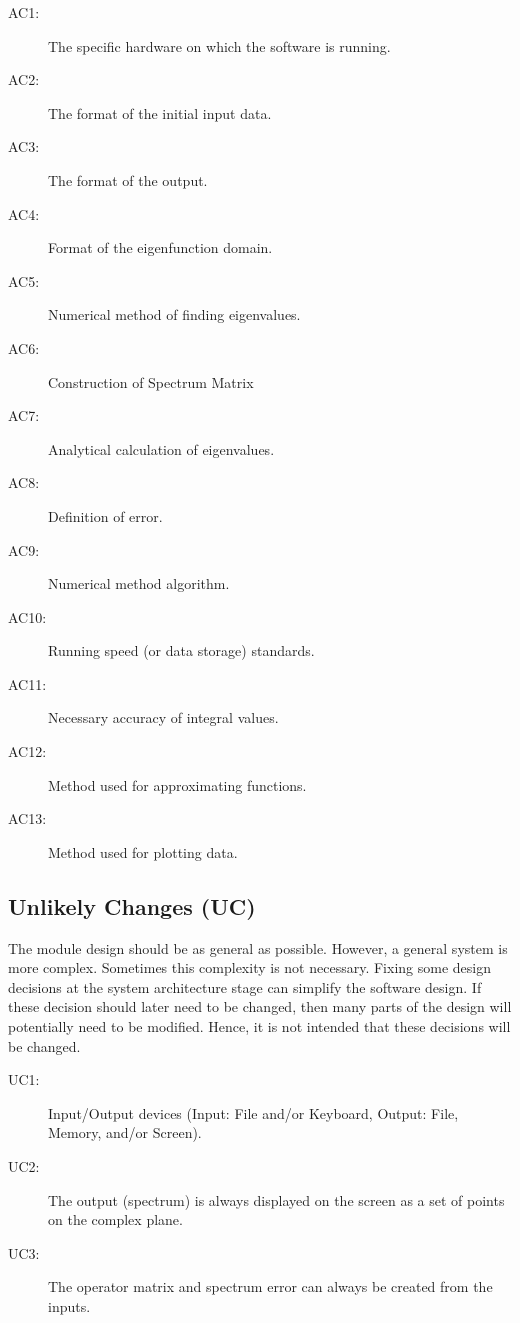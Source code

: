 \documentclass[12pt, titlepage]{article}
\begin{document}
\begin{description}
\item[AC1:] The specific hardware on which the software is running.\\
\item[AC2:] The format of the initial input data.\\
\item[AC3:] The format of the output.\\
\item[AC4:] Format of the eigenfunction domain. \\
\item[AC5:] Numerical method of finding eigenvalues. \\ 
\item[AC6:] Construction of Spectrum Matrix \\ 
\item[AC7:] Analytical calculation of eigenvalues. \\
\item[AC8:] Definition of error. \\
\item[AC9:] Numerical method algorithm. \\ 
\item[AC10:] Running speed (or data storage) standards. \\ 
\item[AC11:] Necessary accuracy of integral values. \\ 
\item[AC12:] Method used for approximating functions. \\
\item[AC13:] Method used for plotting data. \\
\end{description}

\subsection{Unlikely Changes (UC)} \label{SecUchange}

The module design should be as general as possible. However, a general system is
more complex. Sometimes this complexity is not necessary. Fixing some design
decisions at the system architecture stage can simplify the software design. If
these decision should later need to be changed, then many parts of the design
will potentially need to be modified. Hence, it is not intended that these
decisions will be changed.

\begin{description}
\item[UC1:] Input/Output devices
  (Input: File and/or Keyboard, Output: File, Memory, and/or Screen).\\
\item[UC2:] The output (spectrum) is always displayed on the screen as a set of 
points on the complex plane. \\ 
\item[UC3:] The operator matrix and spectrum error can always be created from 
the inputs. \\

\end{description}
\end{document}
